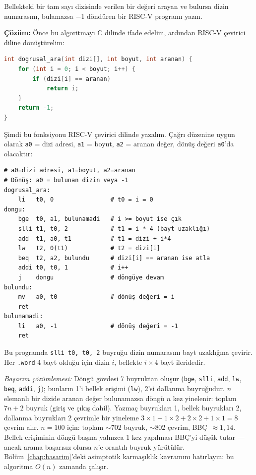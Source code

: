 \begin{ornek}[4.7]
\label{orn:dogrusal-arama}
Bellekteki bir tam sayı dizisinde verilen bir değeri arayan ve bulursa dizin numarasını, bulamazsa $-1$ döndüren bir RISC-V programı yazın.

\textbf{Çözüm:} Önce bu algoritmayı C dilinde ifade edelim, ardından RISC-V çevirici diline dönüştürelim:

\begin{lstlisting}[language=C, style=alistirma-kod]
int dogrusal_ara(int dizi[], int boyut, int aranan) {
    for (int i = 0; i < boyut; i++) {
        if (dizi[i] == aranan)
            return i;
    }
    return -1;
}
\end{lstlisting}

Şimdi bu fonksiyonu RISC-V çevirici dilinde yazalım. Çağrı düzenine uygun olarak \texttt{a0} = dizi adresi, \texttt{a1} = boyut, \texttt{a2} = aranan değer, dönüş değeri \texttt{a0}'da olacaktır:

\begin{lstlisting}[style=riscv]
# a0=dizi adresi, a1=boyut, a2=aranan
# Dönüş: a0 = bulunan dizin veya -1
dogrusal_ara:
    li   t0, 0                # t0 = i = 0
dongu:
    bge  t0, a1, bulunamadi   # i >= boyut ise çık
    slli t1, t0, 2            # t1 = i * 4 (bayt uzaklığı)
    add  t1, a0, t1           # t1 = dizi + i*4
    lw   t2, 0(t1)            # t2 = dizi[i]
    beq  t2, a2, bulundu      # dizi[i] == aranan ise atla
    addi t0, t0, 1            # i++
    j    dongu                # döngüye devam
bulundu:
    mv   a0, t0               # dönüş değeri = i
    ret
bulunamadi:
    li   a0, -1               # dönüş değeri = -1
    ret
\end{lstlisting}

Bu programda \texttt{slli t0, t0, 2} buyruğu dizin numarasını bayt uzaklığına çevirir. Her \texttt{.word} 4 bayt olduğu için dizin $i$, bellekte $i \times 4$ bayt ileridedir.

\emph{Başarım çözümlemesi:} Döngü gövdesi 7 buyruktan oluşur (\texttt{bge}, \texttt{slli}, \texttt{add}, \texttt{lw}, \texttt{beq}, \texttt{addi}, \texttt{j}); bunların 1'i bellek erişimi (\texttt{lw}), 2'si dallanma buyruğudur. $n$ elemanlı bir dizide aranan değer bulunamazsa döngü $n$ kez yinelenir: toplam $7n + 2$ buyruk (giriş ve çıkış dahil). Yazmaç buyrukları 1, bellek buyrukları 2, dallanma buyrukları 2 çevrimle bir yineleme $3 \times 1 + 1 \times 2 + 2 \times 2 + 1 \times 1 = 8$ çevrim alır. $n = 100$ için: toplam $\sim$702 buyruk, $\sim$802 çevrim, BBÇ~$\approx 1{,}14$. Bellek erişiminin döngü başına yalnızca 1 kez yapılması BBÇ'yi düşük tutar --- ancak arama başarısız olursa $n$'e orantılı buyruk yürütülür. Bölüm~\ref{chap:basarim}'deki asimptotik karmaşıklık kavramını hatırlayın: bu algoritma $O(n)$ zamanda çalışır.
\end{ornek}


